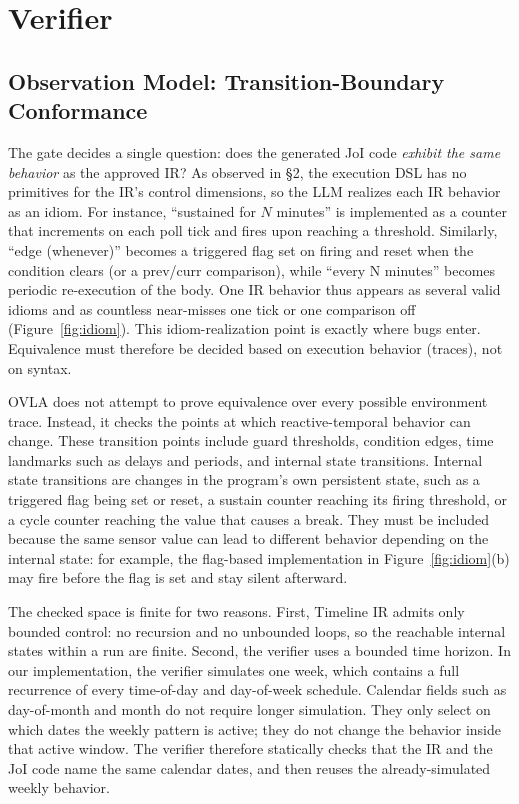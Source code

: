 \documentclass[sigconf,nonacm,anonymous,review]{acmart}
\begin{document}
\section{Verifier}

\subsection{Observation Model: Transition-Boundary Conformance}

The gate decides a single question: does the generated JoI code \emph{exhibit the same behavior} as the approved IR? As observed in \S2, the execution DSL has no primitives for the IR's control dimensions, so the LLM realizes each IR behavior as an idiom. For instance, ``sustained for $N$ minutes'' is implemented as a counter that increments on each poll tick and fires upon reaching a threshold. Similarly, ``edge (whenever)'' becomes a triggered flag set on firing and reset when the condition clears (or a prev/curr comparison), while ``every N minutes'' becomes periodic re-execution of the body. One IR behavior thus appears as several valid idioms and as countless near-misses one tick or one comparison off (Figure~\ref{fig:idiom}). This idiom-realization point is exactly where bugs enter. Equivalence must therefore be decided based on execution behavior (traces), not on syntax.

OVLA does not attempt to prove equivalence over every possible environment trace. Instead, it checks the points at which reactive-temporal behavior can change. These transition points include guard thresholds, condition edges, time landmarks such as delays and periods, and internal state transitions. Internal state transitions are changes in the program's own persistent state, such as a triggered flag being set or reset, a sustain counter reaching its firing threshold, or a cycle counter reaching the value that causes a break. They must be included because the same sensor value can lead to different behavior depending on the internal state: for example, the flag-based implementation in Figure~\ref{fig:idiom}(b) may fire before the flag is set and stay silent afterward.

The checked space is finite for two reasons. First, Timeline IR admits only bounded control: no recursion and no unbounded loops, so the reachable internal states within a run are finite. Second, the verifier uses a bounded time horizon. In our implementation, the verifier simulates one week, which contains a full recurrence of every time-of-day and day-of-week schedule. Calendar fields such as day-of-month and month do not require longer simulation. They only select on which dates the weekly pattern is active; they do not change the behavior inside that active window. The verifier therefore statically checks that the IR and the JoI code name the same calendar dates, and then reuses the already-simulated weekly behavior.
\end{document}
